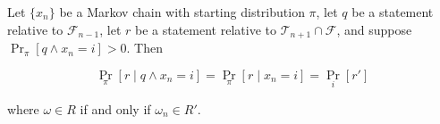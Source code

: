 Let $\{x_n\}$ be a Markov chain with starting distribution $\pi$, let $q$ be a statement relative to $\mathcal{F}_{n-1}$, let $r$ be a statement relative to $\mathcal{T}_{n+1} \cap \mathcal{F}$, and suppose $\Pr_{\pi}[q \land x_n = i] > 0$. Then

$$\Pr_{\pi}[r \mid q \land x_n = i] = \Pr_{\pi}[r \mid x_n = i] = \Pr_i[r']$$

where $\omega \in R$ if and only if $\omega_n \in R'$.
